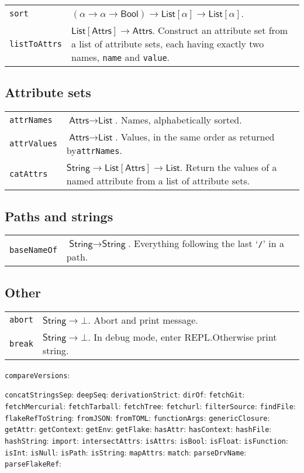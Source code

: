 \documentclass[9pt, a4paper, landscape]{extarticle}
\newcommand{\cmd}[1]{\texttt{#1}}
\newcommand{\str}{\textsf{String}}
\newcommand{\lst}{\textsf{List}}
\newcommand{\ats}{\textsf{Attrs}}
\newcommand{\bln}{\textsf{Bool}}
\begin{document}
\begin{multicols*}{3}
\begin{tabularx}{\columnwidth}{@{}l>{\raggedright\arraybackslash}X@{}}
  \cmd{sort}        & $(\alpha\to\alpha\to\bln)\to\lst[\alpha]\to\lst[\alpha]$. \\

  \cmd{listToAttrs} & $\lst[\ats]\to\ats$. Construct an attribute set
  from a list of attribute sets, each having exactly two names,
  \cmd{name} and \cmd{value}. \\
\end{tabularx}

\subsection*{Attribute sets}
\begin{tabularx}{\columnwidth}{@{}l>{\raggedright\arraybackslash}X@{}}
\cmd{attrNames} & $\ats \to \lst$. Names, alphabetically
sorted. \\
\cmd{attrValues} & $\ats \to \lst$. Values, in the same order as returned
by\cmd{attrNames}. \\
\cmd{catAttrs} & $\str \to \lst[\ats] \to \lst$. Return the values of a
named attribute from a list of attribute sets.

\end{tabularx}

\subsection*{Paths and strings}
\begin{tabularx}{\columnwidth}{@{}l>{\raggedright\arraybackslash}X@{}}
\cmd{baseNameOf} & $\str\to\str$. Everything following the last
`\cmd{/}' in a path.

\end{tabularx}

\subsection*{Other}
\begin{tabularx}{\columnwidth}{@{}l>{\raggedright\arraybackslash}X@{}}
\cmd{abort} & $\str \to \bot $. Abort and print message. \\
\cmd{break} & $\str \to \bot $. In debug mode, enter REPL.\@ Otherwise print string.

\end{tabularx}



\cmd{compareVersions}:

\cmd{concatStringsSep}:
\cmd{deepSeq}:
\cmd{derivationStrict}:
\cmd{dirOf}:
\cmd{fetchGit}:
\cmd{fetchMercurial}:
\cmd{fetchTarball}:
\cmd{fetchTree}:
\cmd{fetchurl}:
\cmd{filterSource}:
\cmd{findFile}:
\cmd{flakeRefToString}:
\cmd{fromJSON}:
\cmd{fromTOML}:
\cmd{functionArgs}:
\cmd{genericClosure}:
\cmd{getAttr}:
\cmd{getContext}:
\cmd{getEnv}:
\cmd{getFlake}:
\cmd{hasAttr}:
\cmd{hasContext}:
\cmd{hashFile}:
\cmd{hashString}:
\cmd{import}:
\cmd{intersectAttrs}:
\cmd{isAttrs}:
\cmd{isBool}:
\cmd{isFloat}:
\cmd{isFunction}:
\cmd{isInt}:
\cmd{isNull}:
\cmd{isPath}:
\cmd{isString}:
\cmd{mapAttrs}:
\cmd{match}:
\cmd{parseDrvName}:
\cmd{parseFlakeRef}:


\end{multicols*}
\end{document}
